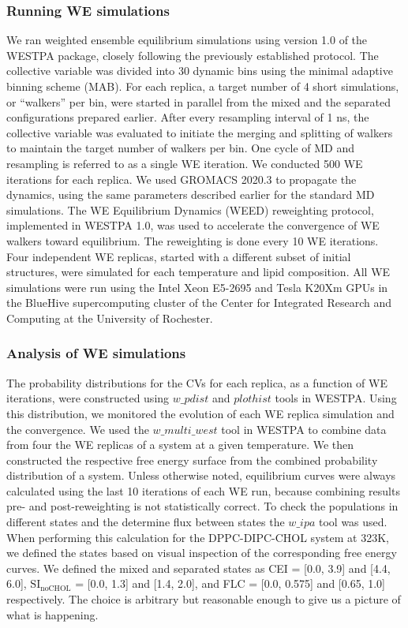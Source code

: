 \documentclass{biophys-new}
\begin{document}
\subsubsection*{Running WE simulations} 
We ran weighted ensemble equilibrium simulations using version 1.0 of the WESTPA package\cite{Zwier2015}, closely following the previously established protocol\cite{Bogetti2019}.
The collective variable was divided into 30 dynamic bins using the minimal adaptive binning scheme (MAB)\cite{Torrillo2021}.
For each replica, a target number of 4 short simulations, or ``walkers'' per bin, were started in parallel from the mixed and the separated configurations prepared earlier.
After every resampling interval of 1 ns, the collective variable was evaluated to initiate the merging and splitting of walkers to maintain the target number of walkers per bin. One cycle of MD and resampling is referred to as a single WE iteration. 
We conducted 500 WE iterations for each replica.
We used GROMACS 2020.3 to propagate the dynamics, using the same parameters described earlier for the standard MD simulations.
The WE Equilibrium Dynamics (WEED) reweighting protocol\cite{Bhatt2010, Suarez2014}, implemented in WESTPA 1.0, was used to accelerate the convergence of WE walkers toward equilibrium.
The reweighting is done every 10 WE iterations.
Four independent WE replicas, started with a different subset of initial structures, were simulated for each temperature and lipid composition. 
All WE simulations were run using the Intel Xeon E5-2695 and Tesla K20Xm GPUs in the BlueHive supercomputing cluster of the Center for Integrated Research and Computing at the University of Rochester.   

\subsubsection*{Analysis of WE simulations}
The probability distributions for the CVs for each replica, as a function of WE iterations, were constructed using $w\_pdist$ and $plothist$ tools in WESTPA.
Using this distribution, we monitored the evolution of each WE replica simulation and the convergence.
We used the $w\_multi\_west$ tool in WESTPA to combine data from four the WE replicas of a system at a given temperature.
We then constructed the respective free energy surface from the combined probability distribution of a system. Unless otherwise noted, equilibrium curves were always calculated using the last 10 iterations of each WE run, because combining results pre- and post-reweighting is not statistically correct.
To check the populations in different states and the determine flux between states the $w\_ipa$ tool was used.
When performing this calculation for the DPPC-DIPC-CHOL system at 323K, we defined the states based on visual inspection of the corresponding free energy curves. We defined the mixed and separated states as CEI = [0.0, 3.9] and [4.4, 6.0], $\text{SI}_{\text{noCHOL}}$ = [0.0, 1.3] and [1.4, 2.0], and FLC = [0.0, 0.575] and [0.65, 1.0] respectively.
The choice is arbitrary but reasonable enough to give us a picture of what is happening. 
\end{document}

